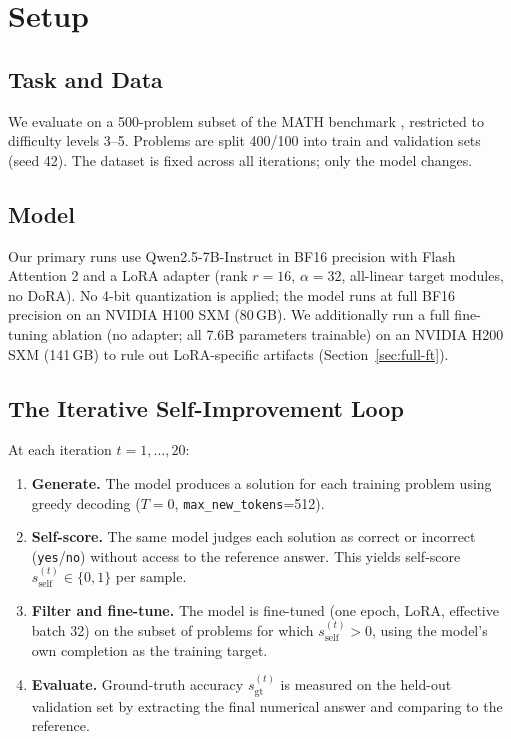 \documentclass{article}
\newcommand{\self}{s_{\text{self}}}     %
\newcommand{\gt}{s_{\text{gt}}}         %
\begin{document}
\section{Setup}
\label{sec:setup}

\subsection{Task and Data}

We evaluate on a 500-problem subset of the MATH benchmark
\citep{hendrycks2021math}, restricted to difficulty levels 3–5.
Problems are split 400/100 into train and validation sets (seed 42).
The dataset is fixed across all iterations; only the model changes.

\subsection{Model}

Our primary runs use Qwen2.5-7B-Instruct \citep{qwen2025} in BF16 precision with
Flash Attention 2 \citep{dao2023flashattention2} and a LoRA adapter \citep{hu2022lora}
(rank $r=16$, $\alpha=32$, all-linear target modules, no DoRA).
No 4-bit quantization is applied; the model runs at full BF16 precision
on an NVIDIA H100 SXM (80\,GB).
We additionally run a full fine-tuning ablation (no adapter; all 7.6B parameters
trainable) on an NVIDIA H200 SXM (141\,GB) to rule out LoRA-specific artifacts
(Section~\ref{sec:full-ft}).

\subsection{The Iterative Self-Improvement Loop}

At each iteration $t = 1, \ldots, 20$:
\begin{enumerate}
  \item \textbf{Generate.} The model produces a solution for each training
        problem using greedy decoding ($T=0$, \texttt{max\_new\_tokens}=512).
  \item \textbf{Self-score.} The same model judges each solution as correct
        or incorrect (\texttt{yes}/\texttt{no}) without access to the
        reference answer. This yields self-score $\self^{(t)} \in \{0,1\}$
        per sample.
  \item \textbf{Filter and fine-tune.} The model is fine-tuned (one epoch,
        LoRA, effective batch 32) on the subset of problems for which
        $\self^{(t)} > 0$, using the model's own completion as the
        training target.
  \item \textbf{Evaluate.} Ground-truth accuracy $\gt^{(t)}$ is measured on
        the held-out validation set by extracting the final numerical answer
        and comparing to the reference.
\end{enumerate}
\end{document}
